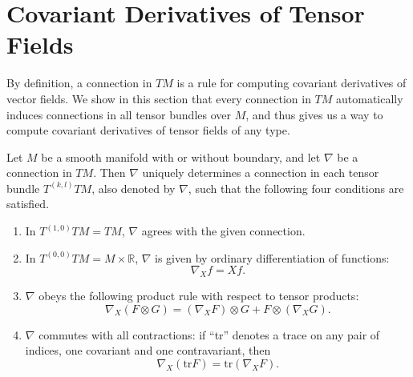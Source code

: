 \section{Covariant Derivatives of Tensor Fields}

By definition, a connection in $TM$ is a rule for computing covariant derivatives of vector fields. We show in this section that every connection in $TM$ automatically induces connections in all tensor bundles over $M$, and thus gives us a way to compute covariant derivatives of tensor fields of any type.

\begin{proposition}\label{prop:connection-on-tensor-bundles}
Let $M$ be a smooth manifold with or without boundary, and let $\nabla$ be a connection in $TM$. Then $\nabla$ uniquely determines a connection in each tensor bundle $T^{(k,l)}TM$, also denoted by $\nabla$, such that the following four conditions are satisfied.
\begin{enumerate}
\item[(i)] In $T^{(1,0)}TM = TM$, $\nabla$ agrees with the given connection.
\item[(ii)] In $T^{(0,0)}TM = M \times \mathbb{R}$, $\nabla$ is given by ordinary differentiation of functions:
\[\nabla_X f = Xf.\]
\item[(iii)] $\nabla$ obeys the following product rule with respect to tensor products:
\[\nabla_X (F \otimes G) = (\nabla_X F) \otimes G + F \otimes (\nabla_X G).\]
\item[(iv)] $\nabla$ commutes with all contractions: if ``tr'' denotes a trace on any pair of indices, one covariant and one contravariant, then
\[\nabla_X (\mathrm{tr} F) = \mathrm{tr}(\nabla_X F).\]
\end{enumerate}


\end{proposition}
